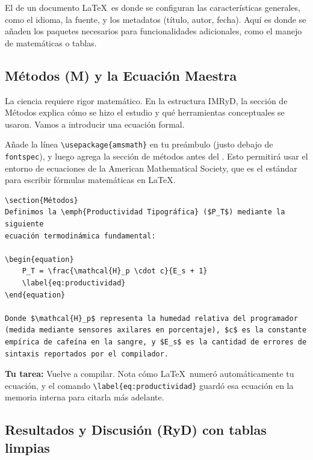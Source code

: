 \begin{remember}
	\label{rem:preambulo}
	El  de un documento \LaTeX\ es donde se configuran las características generales, como el idioma, la fuente, y los metadatos (título, autor, fecha).
	Aquí es donde se añaden los paquetes necesarios para funcionalidades adicionales, como el manejo de matemáticas o tablas.
\end{remember}

\subsection*{ Métodos (M) y la Ecuación Maestra}
\label{sub:paso2_metodos}

La ciencia requiere rigor matemático. En la estructura IMRyD, la sección de
Métodos explica cómo se hizo el estudio y qué herramientas conceptuales se
usaron. Vamos a introducir una ecuación formal.

Añade la línea \verb|\usepackage{amsmath}| en tu preámbulo (justo debajo de
\texttt{fontspec}), y luego agrega la sección de métodos antes del
\verb||.
Esto permitirá usar el entorno de ecuaciones de la American Mathematical
Society, que es el estándar para escribir fórmulas matemáticas en \LaTeX.

\begin{verbatim}
\section{Métodos}
Definimos la \emph{Productividad Tipográfica} ($P_T$) mediante la siguiente
ecuación termodinámica fundamental:

\begin{equation}
    P_T = \frac{\mathcal{H}_p \cdot c}{E_s + 1}
    \label{eq:productividad}
\end{equation}

Donde $\mathcal{H}_p$ representa la humedad relativa del programador
(medida mediante sensores axilares en porcentaje), $c$ es la constante
empírica de cafeína en la sangre, y $E_s$ es la cantidad de errores de
sintaxis reportados por el compilador. 
\end{verbatim}

\textbf{Tu tarea:} Vuelve a compilar. Nota cómo \LaTeX\ numeró
automáticamente tu ecuación, y el comando \verb|\label{eq:productividad}|
guardó esa ecuación en la memoria interna para citarla más adelante.

\subsection*{ Resultados y Discusión (RyD) con tablas limpias}
\label{sub:paso3_resultados}

